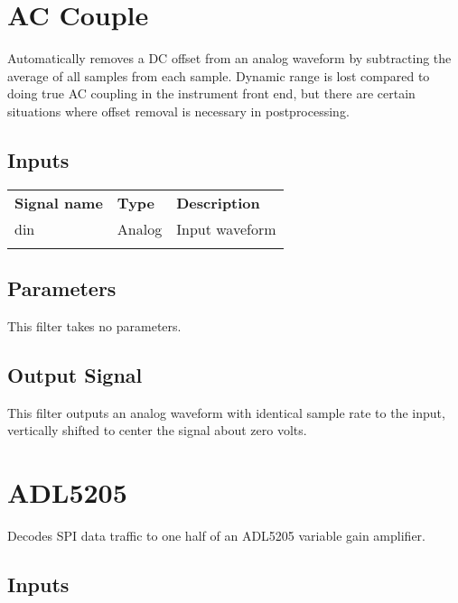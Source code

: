 \pagebreak
\section{AC Couple}

Automatically removes a DC offset from an analog waveform by subtracting the average of all samples from each sample.
Dynamic range is lost compared to doing true AC coupling in the instrument front end, but there are certain situations
where offset removal is necessary in postprocessing.

\subsection{Inputs}

\begin{tabularx}{16cm}{llX}
\thickhline
\textbf{Signal name} & \textbf{Type} & \textbf{Description} \\
\thickhline
din & Analog & Input waveform \\
\thickhline
\end{tabularx}

\subsection{Parameters}

This filter takes no parameters.

\subsection{Output Signal}

This filter outputs an analog waveform with identical sample rate to the input, vertically shifted to center the signal
about zero volts.

\pagebreak
\section{ADL5205}

Decodes SPI data traffic to one half of an ADL5205 variable gain amplifier.

\subsection{Inputs}

